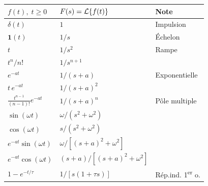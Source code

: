 
\begin{tcolorbox}[colback=ch2orange!5,colframe=ch2orange!80!black,title={Table de Laplace essentielle}]
\begin{center}
\renewcommand{\arraystretch}{1.05}
\scriptsize
\begin{tabular}{@{}lll@{}}
\toprule
$f(t),\; t \geq 0$ & $F(s) = \mathcal{L}\{f(t)\}$ & Note \\
\midrule
$\delta(t)$ & $1$ & Impulsion \\
$\mathbf{1}(t)$ & $1/s$ & \'Echelon \\
$t$ & $1/s^2$ & Rampe \\
$t^n/n!$ & $1/s^{n+1}$ & \\
$e^{-at}$ & $1/(s{+}a)$ & Exponentielle \\
$t\,e^{-at}$ & $1/(s{+}a)^2$ & \\
$\frac{t^{n-1}}{(n{-}1)!}e^{-at}$ & $1/(s{+}a)^n$ & P\^ole multiple \\
$\sin(\omega t)$ & $\omega/(s^2{+}\omega^2)$ & \\
$\cos(\omega t)$ & $s/(s^2{+}\omega^2)$ & \\
$e^{-at}\sin(\omega t)$ & $\omega/[(s{+}a)^2{+}\omega^2]$ & \\
$e^{-at}\cos(\omega t)$ & $(s{+}a)/[(s{+}a)^2{+}\omega^2]$ & \\
$1 - e^{-t/\tau}$ & $1/[s(1{+}\tau s)]$ & R\'ep.ind. 1\textsuperscript{er} o. \\
\bottomrule
\end{tabular}
\end{center}
\end{tcolorbox}

